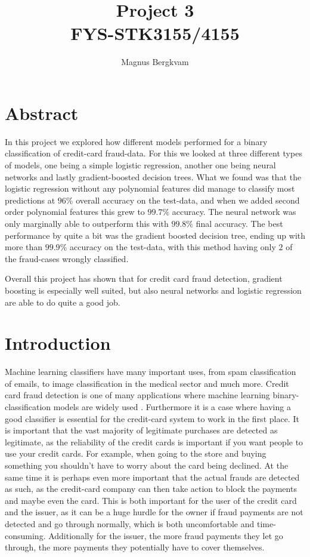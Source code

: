 \documentclass{article}
\title{Project 3 \\ FYS-STK3155/4155}
\author{Magnus Bergkvam}
\begin{document}
\maketitle


\section{Abstract}
In this project we explored how different models performed for a binary
classification of credit-card fraud-data. For this we looked at three different
types of models, one being a simple logistic regression, another one being
neural networks and lastly gradient-boosted decision trees.  What we found was
that the logistic regression without any polynomial features did manage to
classify most predictions at $96\%$ overall accuracy on the test-data, and when
we added second order polynomial features this grew to $99.7\%$ accuracy. The
neural network was only marginally able to outperform this with $99.8\%$ final
accuracy.  The best performance by quite a bit was the gradient boosted decision
tree, ending up with more than $99.9\%$ accuracy on the test-data, with this
method having only $2$ of the fraud-cases wrongly classified.

Overall this project has shown that for credit card fraud detection, gradient
boosting is especially well suited, but also neural networks and logistic
regression are able to do quite a good job.

\section{Introduction}
Machine learning classifiers have many important uses, from spam classification
of emails, to image classification in the medical sector and much more.
Credit card fraud detection is one of many applications where machine learning
binary-classification models are widely used \cite{creditcardfraud}. Furthermore
it is a case where having a good classifier is essential for the credit-card
system to work in the first place. It is important that the vast majority of
legitimate purchases are detected as legitimate, as the reliability of the credit
cards is important if you want people to use your credit cards. For example,
when going to the store and buying something you shouldn't have to worry
about the card being declined. At the same time it is perhaps even more
important that the actual frauds are detected as such, as the credit-card
company can then take action to block the payments and maybe even the card. This
is both important for the user of the credit card and the issuer, as it can be a
huge hurdle for the owner if fraud payments are not detected and go through
normally, which is both uncomfortable and time-consuming. Additionally for the
issuer, the more fraud payments they let go through, the more payments they
potentially have to cover themselves.
\\
\end{document}
